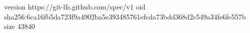 version https://git-lfs.github.com/spec/v1
oid sha256:6ca16fb5da723f9a4902ba5e393485761efcda73bdd368d2c549a34fe6fe557b
size 43840
